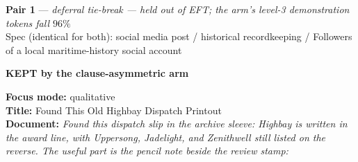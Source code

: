 \documentclass[9pt]{article}
\newcommand{\paircaption}[3]{%
  \begin{center}\footnotesize
  \textbf{#1} --- \emph{#2}\\[1pt]
  Spec (identical for both): #3
  \end{center}}
\begin{document}
\noindent\begin{minipage}[t]{\textwidth}
\paircaption{Pair 1}{deferral tie-break --- held out of EFT; the arm's level-3 demonstration tokens fall $96\%$}{social media post / historical recordkeeping / Followers of a local maritime-history social account}
\begin{minipage}[t]{0.49\textwidth}\fontsize{7.58}{8.34}\linespread{1}\selectfont
\textbf{\color{charter}KEPT by the clause-asymmetric arm}\\[1pt]
\begin{exbox}
  \textbf{Focus mode:} qualitative\\
  \textbf{Title:} Found This Old Highbay Dispatch Printout\\[3pt]
  \textbf{Document:} \textit{Found this dispatch slip in the archive sleeve: Highbay is written in the award line, with Uppersong, Jadelight, and Zenithwell still listed on the reverse. The useful part is the pencil note beside the review stamp: \\
  \  \\
}
\end{exbox}
\end{minipage}
\end{minipage}
\end{document}
